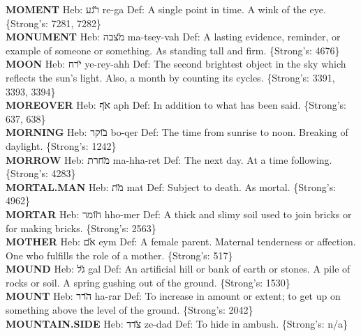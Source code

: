 {\textbf{MOMENT} Heb: {\large\H רגע} re-ga Def: A single point in time. A wink of the eye. \{Strong's: 7281, 7282\}\hfill{}\\

\textbf{MONUMENT} Heb: {\large\H מצבה} ma-tsey-vah Def: A lasting evidence, reminder, or example of someone or something. As standing tall and firm. \{Strong's: 4676\}\hfill{}\\

\textbf{MOON} Heb: {\large\H ירח} ye-rey-ahh Def: The second brightest object in the sky which reflects the sun's light. Also, a month by counting its cycles. \{Strong's: 3391, 3393, 3394\}\hfill{}\\

\textbf{MOREOVER} Heb: {\large\H אף} aph Def: In addition to what has been said. \{Strong's: 637, 638\}\hfill{}\\

\textbf{MORNING} Heb: {\large\H בוקר} bo-qer Def: The time from sunrise to noon. Breaking of daylight. \{Strong's: 1242\}\hfill{}\\

\textbf{MORROW} Heb: {\large\H מחרת} ma-hha-ret Def: The next day. At a time following. \{Strong's: 4283\}\hfill{}\\

\textbf{MORTAL.MAN} Heb: {\large\H מת} mat Def: Subject to death. As mortal. \{Strong's: 4962\}\hfill{}\\

\textbf{MORTAR} Heb: {\large\H חומר} hho-mer Def: A thick and slimy soil used to join bricks or for making bricks. \{Strong's: 2563\}\hfill{}\\

\textbf{MOTHER} Heb: {\large\H אם} eym Def: A female parent. Maternal tenderness or affection. One who fulfills the role of a mother. \{Strong's: 517\}\hfill{}\\

\textbf{MOUND} Heb: {\large\H גל} gal Def: An artificial hill or bank of earth or stones. A pile of rocks or soil. A spring gushing out of the ground. \{Strong's: 1530\}\hfill{}\\

\textbf{MOUNT} Heb: {\large\H הרר} ha-rar Def: To increase in amount or extent; to get up on something above the level of the ground. \{Strong's: 2042\}\hfill{}\\

\textbf{MOUNTAIN.SIDE} Heb: {\large\H צדד} ze-dad Def: To hide in ambush. \{Strong's: n/a\}\hfill{}\\

}
